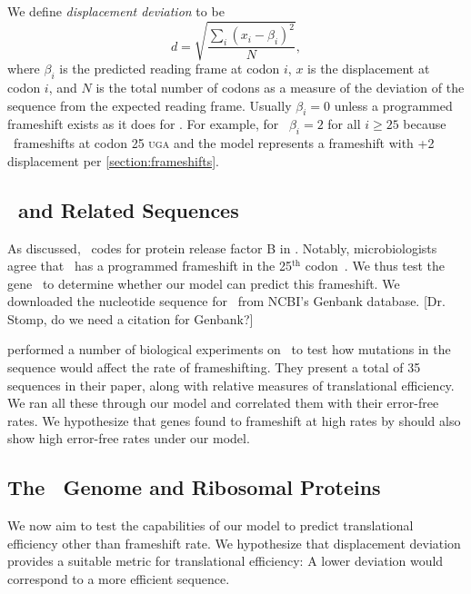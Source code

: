\documentclass[12pt]{article}
\numberwithin{equation}{section}
\begin{document}
We define \emph{displacement deviation} to be
\begin{equation}
    d = \sqrt{\frac{\sum_i \left(x_i - \beta_i\right)^2}{N}},
\end{equation}
where $\beta_i$ is the predicted reading frame at codon $i$, $x$ is
the displacement at codon $i$, and $N$ is the total number of codons
as a measure of the deviation of the sequence from the expected
reading frame.  Usually $\beta_i = 0$ unless a programmed frameshift
exists as it does for \prfB.  For example, for \prfB\ $\beta_i = 2$
for all $i \geq 25$ because \prfB\ frameshifts at codon 25
\textsc{uga} and the model represents a frameshift with +2
displacement per \autoref{section:frameshifts}.

\subsection{\prfB\ and Related Sequences}
As discussed, \prfB\ codes for protein release factor B in \ecoli.
Notably, microbiologists agree that \prfB\ has a programmed frameshift
in the 25$^\textrm{th}$ codon~\cite{weiss87}.  We thus test the
gene \prfB\ to determine whether our model can predict this
frameshift.  We downloaded the nucleotide sequence for \prfB\ from
NCBI's Genbank database.  [Dr. Stomp, do we need a citation for Genbank?]

\citet{weiss87} performed a number of biological experiments on
\prfB\ to test how mutations in the sequence would affect the rate of
frameshifting.  They present a total of 35 sequences in their paper,
along with relative measures of translational efficiency.  We ran all
these through our model and correlated them with their error-free rates.
We hypothesize that genes found to frameshift at high rates by
\citeauthor{weiss87} should also show high error-free rates under
our model.

\subsection{The \ecoli\ Genome and Ribosomal Proteins}
We now aim to test the capabilities of our model to predict translational
efficiency other than frameshift rate.  We hypothesize that displacement
deviation provides a suitable metric for translational efficiency:  A lower
deviation would correspond to a more efficient sequence.  
\end{document}

